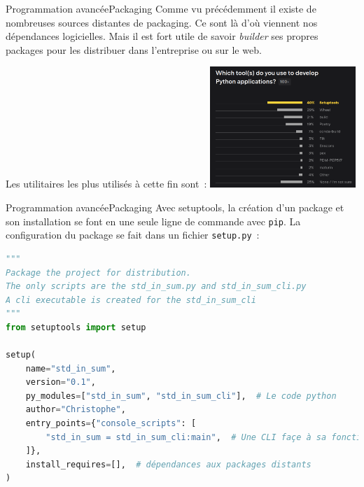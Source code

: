 \documentclass{beamer}
\begin{document}
    \begin{frame}{Programmation avancée}{Packaging}
        Comme vu précédemment il existe de nombreuses sources distantes de packaging.
        Ce sont là d'où viennent nos dépendances logicielles.
        \bigbreak
        Mais il est fort utile de savoir \textit{builder} ses propres packages pour les distribuer dans l'entreprise ou sur le web.

        Les utilitaires les plus utilisés à cette fin sont~:
        \bigbreak
        \centering
        \includegraphics[width=5.5cm]{image/survey_packaging_lib}
    \end{frame}

    \begin{frame}[fragile]{Programmation avancée}{Packaging}
        Avec setuptools, la création d'un package et son installation se font en une seule ligne de commande avec \lstinline{pip}.
        \bigbreak
        La configuration du package se fait dans un fichier \lstinline{setup.py}~:
        \begin{lstlisting}[language=Python]
"""
Package the project for distribution.
The only scripts are the std_in_sum.py and std_in_sum_cli.py
A cli executable is created for the std_in_sum_cli
"""
from setuptools import setup

setup(
    name="std_in_sum",
    version="0.1",
    py_modules=["std_in_sum", "std_in_sum_cli"],  # Le code python
    author="Christophe",
    entry_points={"console_scripts": [
        "std_in_sum = std_in_sum_cli:main",  # Une CLI façe à sa fonction main
    ]},
    install_requires=[],  # dépendances aux packages distants
)
        \end{lstlisting}
    \end{frame}
\end{document}
